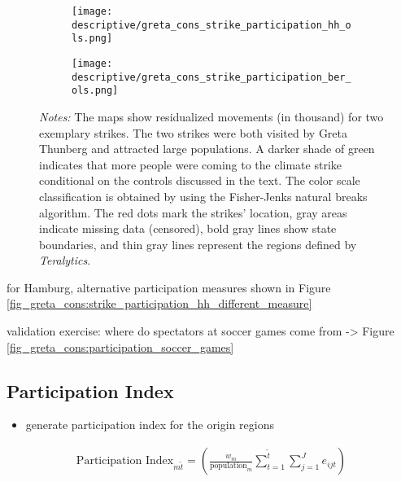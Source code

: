 \begin{figure}[H]\centering
	\caption{Strike participation for selected strikes}
	\label{fig_greta_cons:strike_participation_hh_ber}
	\begin{subfigure}[h]{0.45\linewidth}\centering
		\texttt{[image: descriptive/greta\_cons\_strike\_participation\_hh\_ols.png]}
	\end{subfigure}
	\begin{subfigure}[h]{0.45\linewidth}\centering
		\texttt{[image: descriptive/greta\_cons\_strike\_participation\_ber\_ols.png]}
	\end{subfigure}
	\begin{minipage}{0.9\linewidth}
		\scriptsize{\emph{Notes:} The maps show residualized movements (in thousand) for two exemplary strikes. The two strikes were both visited by Greta Thunberg and attracted large populations. A darker shade of green indicates that more people were coming to the climate strike conditional on the controls discussed in the text. The color scale classification is obtained by using the Fisher-Jenks natural breaks algorithm. The red dots mark the strikes' location, gray areas indicate missing data (censored), bold gray lines show state boundaries, and thin gray lines represent the regions defined by \textit{Teralytics}.}
	\end{minipage}
\end{figure}


for Hamburg, alternative participation measures shown in Figure \ref{fig_greta_cons:strike_participation_hh_different_measure}

validation exercise: where do spectators at soccer games come from -> Figure \ref{fig_greta_cons:participation_soccer_games}






\subsection{Participation Index}
	
\begin{itemize}	
	\item generate participation index for the origin regions
\end{itemize}
\begin{align}
	\text{Participation Index}_{m\tilde{t}} = \left( \frac{w_{m}}{\text{population}_{m}} \sum\limits_{t=1}^{\tilde{t}}\sum\limits_{j=1}^{J} e_{ijt}\right) \label{eq_greta_cons:participation_index}
\end{align}

